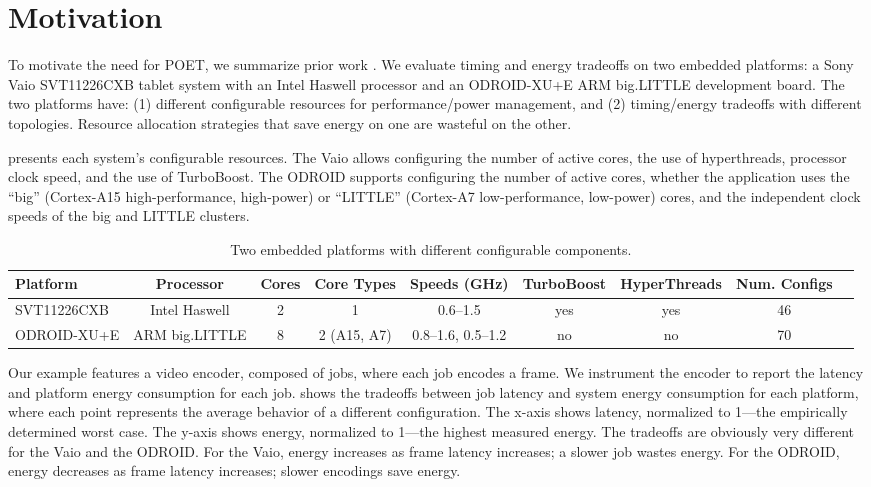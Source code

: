 \section{Motivation}
\label{sec:poet-motivation}

To motivate the need for POET, we summarize prior work \cite{Imes2014}.
We evaluate timing and energy tradeoffs on two embedded platforms: a Sony Vaio SVT11226CXB tablet system with an Intel Haswell processor and an ODROID-XU+E ARM big.LITTLE development board.
The two platforms have: (1) different configurable resources for performance/power management, and (2) timing/energy tradeoffs with different topologies.
Resource allocation strategies that save energy on one are wasteful on the other.

 presents each system's configurable resources.
The Vaio allows configuring the number of active cores, the use of hyperthreads, processor clock speed, and the use of TurboBoost.
The ODROID supports configuring the number of active cores, whether the application uses the ``big'' (Cortex-A15 high-performance, high-power) or ``LITTLE'' (Cortex-A7 low-performance, low-power) cores, and the independent clock speeds of the big and LITTLE clusters.

\begin{table}[t]
\caption{Two embedded platforms with different configurable components.}
\label{tbl:poet-machines}
\tiny
\centering
\begin{tabular}{lcccccccc}
  \textbf{Platform} & 
  \textbf{Processor} &
  \textbf{Cores} & 
  \textbf{Core Types} &
  \textbf{Speeds (GHz)} &
  \textbf{TurboBoost} &
  \textbf{HyperThreads} & 
  \textbf{Num. Configs} \\
  \hline
  \hline
  SVT11226CXB & Intel Haswell  & 2 & 1             & 0.6--1.5          & yes & yes & 46 \\
  ODROID-XU+E & ARM big.LITTLE & 8 & 2 (A15, A7)   & 0.8--1.6, 0.5--1.2 & no  & no  & 70 \\
  \hline 
  \hline
\end{tabular}
\end{table}

Our example features a video encoder, composed of jobs, where each job encodes a frame.
We instrument the encoder to report the latency and platform energy consumption for each job.
 shows the tradeoffs between job latency and system energy consumption for each platform, where each point represents the average behavior of a different configuration.
The x-axis shows latency, normalized to 1---the empirically determined worst case.
The y-axis shows energy, normalized to 1---the highest measured energy.
The tradeoffs are obviously very different for the Vaio and the ODROID.
For the Vaio, energy increases as frame latency increases; \ie a slower job wastes energy.
For the ODROID, energy decreases as frame latency increases; \ie slower encodings save energy.

